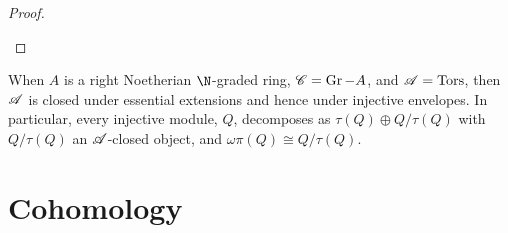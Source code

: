 \documentclass[10pt]{amsart}
\begin{document}
\begin{cor}
\begin{proof}
\begin{enumerate}[(i)]
      \end{enumerate}
    \end{proof}
\end{cor}

\begin{rmk}
  When $A$ is a right Noetherian $\N$-graded ring, $\mathscr{C} = \operatorname{Gr}-A$, and $\mathscr{A} = \operatorname{Tors}$, then $\mathscr{A}$ is closed under essential extensions and hence under injective envelopes.
  In particular, every injective module, $Q$, decomposes as $\tau(Q) \oplus Q/\tau(Q)$ with $Q/\tau(Q)$ an $\mathscr{A}$-closed object, and $\omega\pi(Q) \cong Q/\tau(Q)$.
\end{rmk}

\section{Cohomology}
\end{document}

